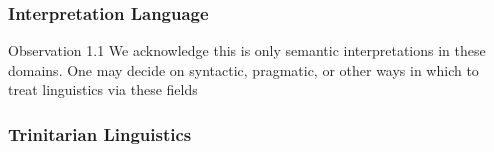 \documentclass[10pt]{beamer}
\begin{document}
\begin{frame}[fragile]
\frametitle{Interpretation Language}
\begin{alertblock}{Observation 1.1}
  We acknowledge this is only semantic interpretations in these domains.
  One may decide on syntactic, pragmatic, or other ways in which to treat
  linguistics via these fields
\end{alertblock}  
\centering 
{} 

\end{frame}


\begin{frame}[fragile]
\frametitle{Trinitarian Linguistics }
\centering 
{} 

\end{frame}
\end{document}
